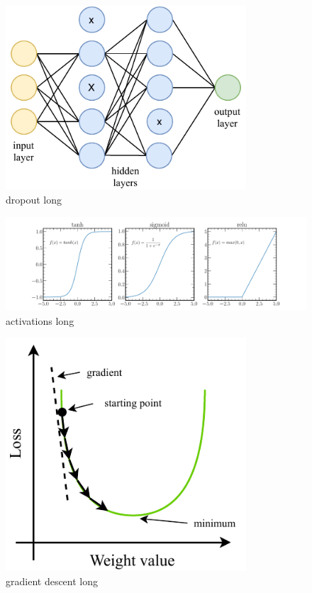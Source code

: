 \begin{figure} %
    \includegraphics[width=0.8\textwidth]{diagrams/7-cvn/dropout.pdf}
    \caption[dropout short]
    {dropout long}
    \label{fig:dropout}
\end{figure}

\begin{figure} %
    \includegraphics[width=\textwidth]{diagrams/7-cvn/activations.pdf}
    \caption[activations short]
    {activations long}
    \label{fig:activations}
\end{figure}

\begin{figure} %
    \includegraphics[width=0.8\textwidth]{diagrams/7-cvn/gradient_descent.pdf}
    \caption[gradient descent short]
    {gradient descent long}
    \label{fig:gradient_descent}
\end{figure}

